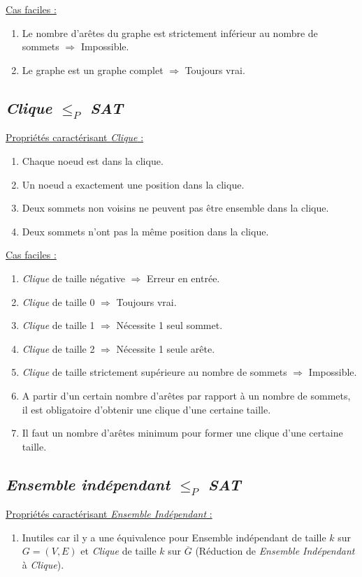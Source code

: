   \underline{Cas faciles :}
  \begin{enumerate}
   \item Le nombre d'arêtes du graphe est strictement inférieur au
	 nombre de sommets $\Rightarrow$ Impossible.
   \item Le graphe est un graphe complet $\Rightarrow$ Toujours vrai.
  \end{enumerate}

  \subsection{\emph{Clique} $\leq_P$ \emph{SAT}}
  \underline{Propriétés caractérisant \emph{Clique} :}
  \begin{enumerate}
   \item Chaque noeud est dans la clique.
   \item Un noeud a exactement une position dans la clique.
   \item Deux sommets non voisins ne peuvent pas être ensemble dans la
	 clique.
   \item Deux sommets n'ont pas la même position dans la clique.
  \end{enumerate}

  \underline{Cas faciles :}
  \begin{enumerate}
   \item \emph{Clique} de taille négative $\Rightarrow$ Erreur en
	 entrée.
   \item \emph{Clique} de taille 0 $\Rightarrow$ Toujours vrai.
   \item \emph{Clique} de taille 1 $\Rightarrow$ Nécessite 1 seul
	 sommet.
   \item \emph{Clique} de taille 2 $\Rightarrow$ Nécessite 1 seule
	 arête.
   \item \emph{Clique} de taille strictement supérieure au nombre de
	 sommets $\Rightarrow$ Impossible.
   \item A partir d'un certain nombre d'arêtes par rapport à un nombre
	 de sommets, il est obligatoire d'obtenir une clique d'une
	 certaine taille.
   \item Il faut un nombre d'arêtes minimum pour former une clique d'une
	 certaine taille.
  \end{enumerate}

  \subsection{\emph{Ensemble indépendant} $\leq_P$ \emph{SAT}}
  \underline{Propriétés caractérisant \emph{Ensemble Indépendant} :}
  \begin{enumerate}
   \item Inutiles car il y a une équivalence pour Ensemble indépendant
	 de taille $k$ sur $G = (V,E)$ et \emph{Clique} de taille $k$
	 sur $\overline{G}$ (Réduction de \emph{Ensemble Indépendant} à
	 \emph{Clique}).
  \end{enumerate}

